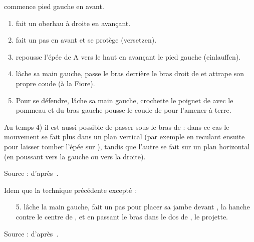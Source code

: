 \begin{technique}
\label{épée-longue:tech:dg-armringen-einlauffen}

\A commence pied gauche en avant.

\begin{enumerate}
	\item \A fait un oberhau à droite en avançant.
	\item \D fait un pas en avant et se protège (versetzen).
	\item \D repousse l'épée de A vers le haut en avançant le pied gauche (einlauffen).
	\item \D lâche sa main gauche, passe le bras derrière le bras droit de \A et attrape son propre coude (à la Fiore).
	\item Pour se défendre, \A lâche sa main gauche, crochette le poignet de \D avec le pommeau et du bras gauche pousse le coude de \D pour l'amener à terre.
\end{enumerate}

Au temps 4) il est aussi possible de passer sous le bras de \A : dans ce cas le mouvement se fait plus dans un plan vertical (par exemple en reculant ensuite pour laisser tomber l'épée sur \A), tandis que l'autre se fait sur un plan horizontal (en poussant \A vers la gauche ou vers la droite).

Source : d'après~\cite{kronenburg:dijon:going_distance:2015}.

\end{technique}


\begin{technique}
\label{épée-longue:tech:dg-leibringen-einlauffen}

Idem que la technique précédente excepté :
\begin{enumerate}
	\item[5.] \A lâche la main gauche, fait un pas pour placer sa jambe devant \D, la hanche contre le centre de \D, et en passant le bras dans le dos de \D, \A le projette.
\end{enumerate}

Source : d'après~\cite{kronenburg:dijon:going_distance:2015}.

\end{technique}



